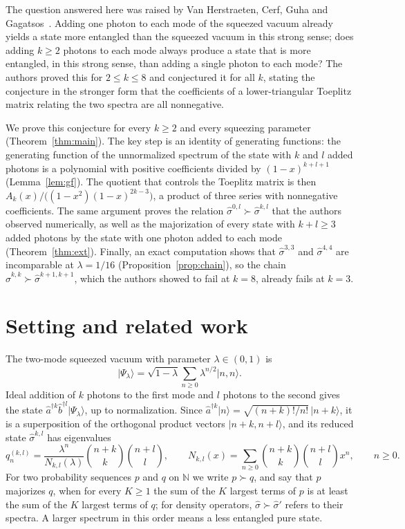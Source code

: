 \documentclass[11pt,a4paper]{article}
\theoremstyle{definition}
\theoremstyle{plain}
\newcommand{\ket}[1]{\lvert#1\rangle}
\newcommand{\N}{\mathbb{N}}
\newcommand{\sig}[2]{\hat\sigma^{#1,#2}}
\begin{document}
The question answered here was raised by Van Herstraeten, Cerf, Guha and
Gagatsos~\cite{VanHerstraeten2024}. Adding one photon to each mode of the
squeezed vacuum already yields a state more entangled than the squeezed vacuum
in this strong sense; does adding $k\ge 2$ photons to each mode always produce a
state that is more entangled, in this strong sense, than adding a single photon
to each mode? The authors proved this for $2\le k\le 8$ and conjectured it for
all $k$, stating the conjecture in the stronger form that the coefficients of a
lower-triangular Toeplitz matrix relating the two spectra are all
nonnegative.

We prove this conjecture for every $k\ge 2$ and every squeezing parameter
(Theorem~\ref{thm:main}). The key step is an identity of generating functions:
the generating function of the unnormalized spectrum of the state with $k$ and
$l$ added photons is a polynomial with positive coefficients divided by
$(1-x)^{k+l+1}$ (Lemma~\ref{lem:gf}). The quotient that controls the Toeplitz
matrix is then $A_k(x)/\bigl((1-x^2)(1-x)^{2k-3}\bigr)$, a product of three
series with nonnegative coefficients. The same argument proves the relation
$\sig0l\succ\sig kl$ that the authors observed numerically, as well as the
majorization of every state with $k+l\ge 3$ added photons by the state with
one photon added to each mode (Theorem~\ref{thm:ext}). Finally, an exact
computation shows that $\sig33$ and $\sig44$ are incomparable at $\lambda=1/16$
(Proposition~\ref{prop:chain}), so the chain $\sig kk\succ\sig{k+1}{k+1}$,
which the authors showed to fail at $k=8$, already fails at $k=3$.

\section{Setting and related work}\label{sec:related}
The two-mode squeezed vacuum with parameter $\lambda\in(0,1)$ is
\[
\ket{\Psi_\lambda}=\sqrt{1-\lambda}\sum_{n\ge0}\lambda^{n/2}\ket{n,n}.
\]
Ideal addition of $k$ photons to the first mode and $l$ photons to the second
gives the state $\hat a^{\dagger k}\hat b^{\dagger l}\ket{\Psi_\lambda}$, up to
normalization. Since $\hat a^{\dagger k}\ket n=\sqrt{(n+k)!/n!}\,\ket{n+k}$, it
is a superposition of the orthogonal product vectors $\ket{n+k,n+l}$, and its
reduced state $\sig kl$ has eigenvalues
\begin{equation}\label{eq:spectrum}
q^{(k,l)}_n=\frac{\lambda^n}{N_{k,l}(\lambda)}\binom{n+k}{k}\binom{n+l}{l},
\qquad
N_{k,l}(x)=\sum_{n\ge0}\binom{n+k}{k}\binom{n+l}{l}x^n,
\qquad n\ge0 .
\end{equation}
For two probability sequences $p$ and $q$ on $\N$ we write $p\succ q$, and
say that $p$ majorizes $q$, when for every $K\ge1$ the sum of the $K$ largest
terms of $p$ is at least the sum of the $K$ largest terms of $q$; for density
operators, $\hat\sigma\succ\hat\sigma'$ refers to their spectra. A larger
spectrum in this order means a less entangled pure state.
\end{document}
